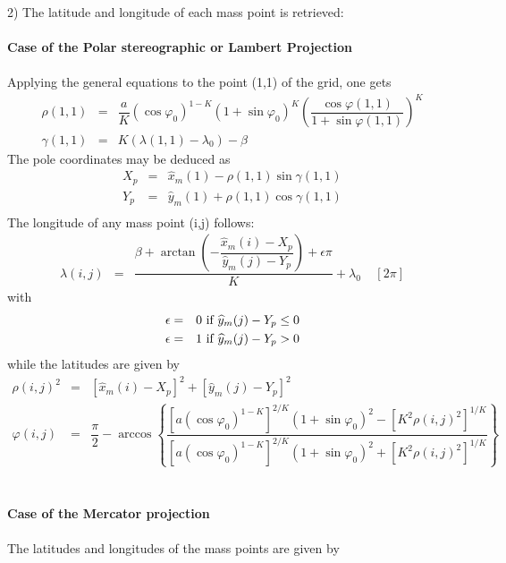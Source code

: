 2) The latitude and longitude of each mass point is retrieved:
\\
\\
{\bf Case of the Polar stereographic or Lambert Projection}
\\
\\
Applying the general equations to the point (1,1) of the grid, one gets
\begin{eqnarray}
\rho (1,1) & = & \dfrac{a}{K} (\cos\varphi _{0})^{1-K}
 (1 + \sin\varphi _{0})^{K}
\left(\dfrac{\cos\varphi (1,1)}{1 + \sin\varphi (1,1)}\right)^{K} \nonumber\\
\gamma (1,1) & = &   K (\lambda (1,1) - \lambda _{0}) - \beta
\end{eqnarray}
The pole coordinates may be deduced as
\begin{eqnarray}
X_{p} & = &  \widehat{x}_m(1) -  \rho (1,1) \sin\gamma (1,1)  \nonumber \\
Y_{p} & = & \widehat{y}_m(1) + \rho (1,1) \cos\gamma (1,1) \nonumber \\
\end{eqnarray}
The longitude of any mass point (i,j) follows:
\begin{eqnarray}
\lambda (i,j) &=&  \dfrac{\beta + \arctan \left( -
\dfrac{ \widehat{x}_{m}(i)- X_{p}}{ \widehat{y}_{m}(j)- Y_{p}}
 \right) + \epsilon  \pi}{K} + \lambda_{0} \; \; \; \;  \left[ 2 \pi \right]
\end{eqnarray}
with
\begin{eqnarray*}
\epsilon & = & 0 \hbox{ if } \widehat{y}_{m}(j)- Y_{p} \leq 0 \\
\epsilon & = & 1 \hbox{ if } \widehat{y}_{m}(j)- Y_{p} > 0
\end{eqnarray*}
while the latitudes are given by
\begin{eqnarray}
\rho  (i,j)^{2} &=&  \left[ \widehat{x}_m(i) - X_{p} \right]^{2} +
 \left[ \widehat{y}_m(j) - Y_{p}\right] ^{2} \nonumber \\
\varphi (i,j) &=& \dfrac{\pi}{2} - \arccos \left\{ \dfrac{
\left[ a (\cos \varphi_{0})^{1-K} \right] ^{2/K} (1 + \sin\varphi _{0})^{2} -
\left[ K^{2} \rho  (i,j)^{2} \right] ^{1/K} }{
\left[ a (\cos \varphi_{0})^{1-K} \right] ^{2/K} (1 + \sin\varphi _{0})^{2}+
 \left[ K^{2} \rho  (i,j)^{2}  \right] ^{1/K} }
\right\}
\end{eqnarray}
\\
\\
{\bf Case of the Mercator projection}
\\
\\
The latitudes and longitudes of the mass points are given by
